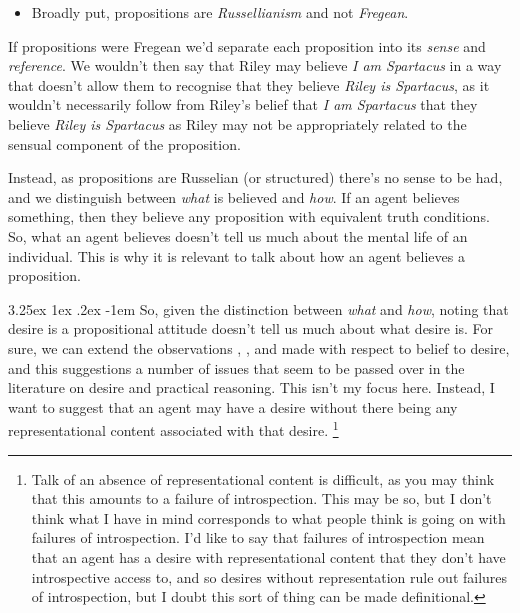 \documentclass[10pt]{article}
\makeatletter
\newcommand{\hand}{\ding{43}}
\renewcommand\paragraph{\@startsection{paragraph}{5}{\z@}%
  {3.25ex \@plus1ex \@minus.2ex}%
  {-1em}%
  {\normalfont\normalsize\bfseries}}
\makeatother
\begin{document}
\begin{itemize}
\item[\hand] Broadly put, propositions are \emph{Russellianism} and not \emph{Fregean}.
\end{itemize}

If propositions were Fregean we'd separate each proposition into its \emph{sense} and \emph{reference}.
We wouldn't then say that Riley may believe \emph{I am Spartacus} in a way that doesn't allow them to recognise that they believe \emph{Riley is Spartacus}, as it wouldn't necessarily follow from Riley's belief that \emph{I am Spartacus} that they believe \emph{Riley is Spartacus} as Riley may not be appropriately related to the sensual component of the proposition.

Instead, as propositions are Russelian (or structured) there's no sense to be had, and we distinguish between \emph{what} is believed and \emph{how}.
If an agent believes something, then they believe any proposition with equivalent truth conditions.
So, what an agent believes doesn't tell us much about the mental life of an individual.
This is why it is relevant to talk about how an agent believes a proposition.


\paragraph{ }
So, given the distinction between \emph{what} and \emph{how}, noting that desire is a propositional attitude doesn't tell us much about what desire is.
For sure, we can extend the observations \citeauthor{Kaplan:1989aa}, \citeauthor{Lewis:1979aa}, and \citeauthor{Perry:1993aa} made with respect to belief to desire, and this suggestions a number of issues that seem to be passed over in the literature on desire and practical reasoning.
This isn't my focus here.
Instead, I want to suggest that an agent may have a desire without there being any representational content associated with that desire.\nolinebreak
\footnote{
  Talk of an absence of representational content is difficult, as you may think that this amounts to a failure of introspection.
  This may be so, but I don't think what I have in mind corresponds to what people think is going on with failures of introspection.
  I'd like to say that failures of introspection mean that an agent has a desire with representational content that they don't have introspective access to, and so desires without representation rule out failures of introspection, but I doubt this sort of thing can be made definitional.
}
\end{document}
